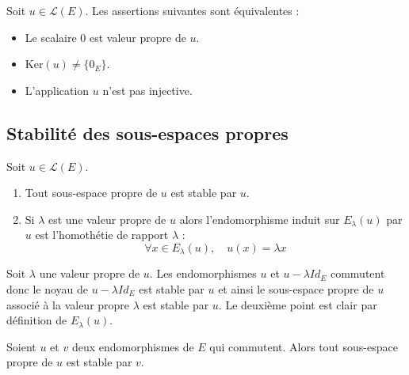 \documentclass[a4paper,10pt]{report}
\begin{document}
\medskip
%

\begin{cor} Soit $u \in \mathcal{L}(E)$. Les assertions suivantes sont équivalentes :

\begin{itemize}
\item Le scalaire $0$ est valeur propre de $u$.
\item $\textrm{Ker}(u) \neq \lbrace 0_E \rbrace$.
\item L'application $u$ n'est pas injective.
\end{itemize}
\end{cor}

\subsection{Stabilité des sous-espaces propres}

\begin{prop}\label{stab} Soit $u \in \mathcal{L}(E)$. 

\begin{enumerate}
\item Tout sous-espace propre de $u$ est stable par $u$.
\item Si $\lambda$ est une valeur propre de $u$ alors l'endomorphisme induit sur $E_{\lambda}(u)$ par $u$ est l'homothétie de rapport $\lambda$ :
$$ \forall x \in E_{\lambda}(u), \quad u(x) = \lambda x$$
\end{enumerate}
\end{prop}

%
%

\begin{preuve} Soit $\lambda$ une valeur propre de $u$. Les endomorphismes $u$ et $u- \lambda Id_E$ commutent donc le noyau de $u- \lambda Id_E$ est stable par $u$ et ainsi le sous-espace propre de $u$ associé à la valeur propre $\lambda$ est stable par $u$. Le deuxième point est clair par définition de $E_{\lambda}(u)$.
\end{preuve}

\begin{prop} Soient $u$ et $v$ deux endomorphismes de $E$ qui commutent. Alors tout sous-espace propre de $u$ est stable par $v$.
\end{prop}
\end{document}
